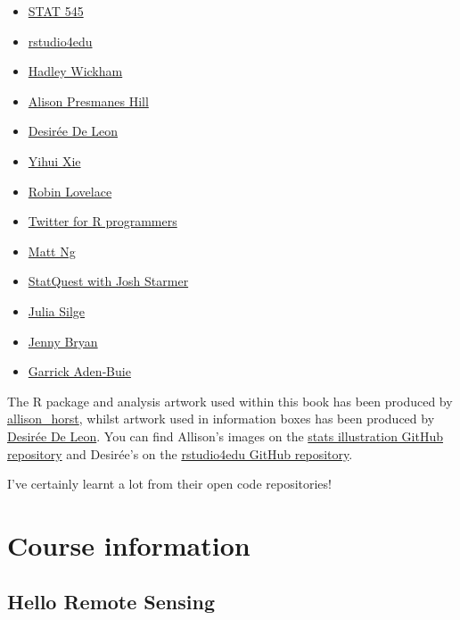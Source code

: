 \documentclass[
]{book}
\providecommand{\tightlist}{%
  \setlength{\itemsep}{0pt}\setlength{\parskip}{0pt}}
\begin{document}
\begin{itemize}
\tightlist
\item
  \href{https://stat545.com/index.html\#other-contributors}{STAT 545}
\item
  \href{https://rstudio4edu.github.io/rstudio4edu-book/}{rstudio4edu}
\item
  \href{https://twitter.com/hadleywickham}{Hadley Wickham}
\item
  \href{https://twitter.com/apreshill}{Alison Presmanes Hill}
\item
  \href{https://twitter.com/dcossyle}{Desirée De Leon}
\item
  \href{https://twitter.com/xieyihui}{Yihui Xie}
\item
  \href{https://twitter.com/robinlovelace}{Robin Lovelace}
\item
  \href{https://www.t4rstats.com/index.html}{Twitter for R programmers}
\item
  \href{https://twitter.com/mattnkm}{Matt Ng}
\item
  \href{https://www.youtube.com/channel/UCtYLUTtgS3k1Fg4y5tAhLbw}{StatQuest with Josh Starmer}
\item
  \href{https://twitter.com/juliasilge}{Julia Silge}
\item
  \href{https://twitter.com/JennyBryan}{Jenny Bryan}
\item
  \href{https://twitter.com/grrrck}{Garrick Aden‑Buie}
\end{itemize}

The R package and analysis artwork used within this book has been produced by \href{https://twitter.com/allison_horst}{allison\_horst}, whilst artwork used in information boxes has been produced by \href{https://twitter.com/dcossyle}{Desirée De Leon}. You can find Allison's images on the \href{https://github.com/allisonhorst/stats-illustrations}{stats illustration GitHub repository} and Desirée's on the \href{https://github.com/rstudio4edu/rmd4edu}{rstudio4edu GitHub repository}.

I've certainly learnt a lot from their open code repositories!

\hypertarget{part-course-information}{%
\part*{Course information}\label{part-course-information}}

\hypertarget{hello-remote-sensing}{%
\chapter*{Hello Remote Sensing}\label{hello-remote-sensing}}
\end{document}
